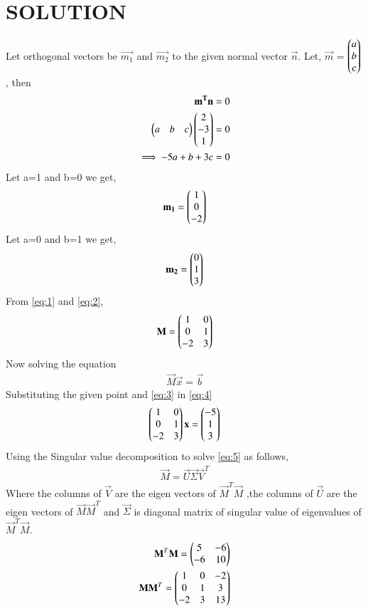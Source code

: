 \documentclass[journal,12pt,twocolumn]{IEEEtran}
\begin{document}
\section{SOLUTION}
Let orthogonal vectors be $\vec{m_1}$ and $\vec{m_2}$ to the given normal vector $\vec{n}$. Let, $\vec{m}$ = $\begin{pmatrix}a\\b\\c\end{pmatrix}$, then
\begin{align}
\mathbf{m^T}\mathbf{n} = 0\\
\begin{pmatrix}a&b&c\end{pmatrix}\begin{pmatrix}2\\-3\\1\end{pmatrix} = 0\\
\implies-5a+b+3c = 0
\end{align}
Let a=1 and b=0 we get,
\begin{align}
\mathbf{m_1} = \begin{pmatrix}1\\0\\-2\end{pmatrix} \label{eq:1}
\end{align}
Let a=0 and b=1 we get,
\begin{align}
\mathbf{m_2} = \begin{pmatrix}0\\1\\3\end{pmatrix} \label{eq:2}
\end{align}
From \eqref{eq:1} and \eqref{eq:2},
\begin{align}
\mathbf{M}= \begin{pmatrix}1&0\\0&1\\-2&3\end{pmatrix} \label{eq:3}
\end{align}
Now solving the equation
\begin{align}
\vec{M}\vec{x} = \vec{b}\label{eq:4}
\end{align}
Substituting the given point and \eqref{eq:3} in \eqref{eq:4}
\begin{align}
\begin{pmatrix}1&0\\0&1\\-2&3\end{pmatrix}\mathbf{x}=\begin{pmatrix}-5\\1\\3\end{pmatrix}\label{eq:5}
\end{align}
Using the Singular value decomposition to solve \eqref{eq:5} as follows,
\begin{align}
\vec{M}=\vec{U}\vec{\Sigma}\vec{V}^T\label{eq:6}
\end{align}
Where the columns of $\vec{V}$ are the eigen vectors of $\vec{M}^T\vec{M}$ ,the columns of $\vec{U}$ are the eigen vectors of $\vec{M}\vec{M}^T$ and $\vec{\Sigma}$ is diagonal matrix of singular value of eigenvalues of $\vec{M}^T\vec{M}$.
\begin{align}
\mathbf{M}^T\mathbf{M}=\begin{pmatrix}5&-6\\-6&10\end{pmatrix}\label{eq:7}\\
\mathbf{M}\mathbf{M}^T =\begin{pmatrix}1&0&-2\\0&1&3\\-2&3&13\end{pmatrix}
\end{align}
\end{document}
